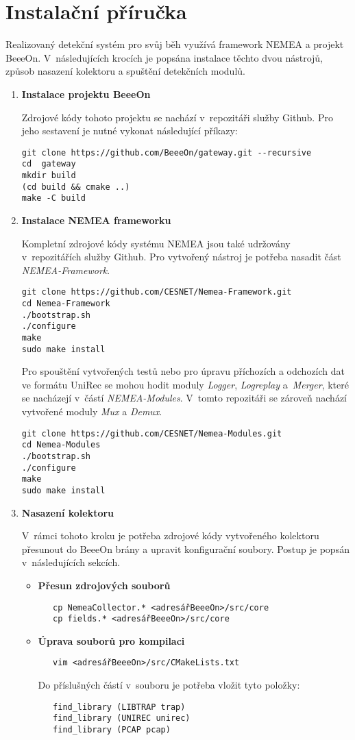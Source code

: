 \documentclass[thesis=M,czech]{FITthesis}[2012/06/26]
\begin{document}
\chapter{Instalační příručka}
Realizovaný detekční systém pro svůj běh využívá framework NEMEA a projekt BeeeOn. V~následujících
krocích je popsána instalace těchto dvou nástrojů, způsob nasazení kolektoru a
spuštění detekčních modulů.

\begin{enumerate}
 \item \textbf{Instalace projektu BeeeOn}
 
 Zdrojové kódy tohoto projektu se nachází v~repozitáři služby Github. Pro jeho sestavení je nutné
 vykonat následující příkazy: 
\begin{verbatim}
git clone https://github.com/BeeeOn/gateway.git --recursive
cd  gateway
mkdir build
(cd build && cmake ..)
make -C build
\end{verbatim}
 \item \textbf{Instalace NEMEA frameworku}
 
Kompletní zdrojové kódy systému NEMEA jsou také udržovány v~repozitářích služby Github. Pro
vytvořený nástroj je potřeba nasadit část \textit{NEMEA-Framework}.
\begin{verbatim}
git clone https://github.com/CESNET/Nemea-Framework.git
cd Nemea-Framework
./bootstrap.sh
./configure
make
sudo make install
\end{verbatim}

Pro spouštění vytvořených testů nebo pro úpravu příchozích a odchozích dat ve formátu UniRec se
mohou hodit moduly \textit{Logger}, \textit{Logreplay} a~\textit{Merger}, které se nacházejí
v~částí \textit{NEMEA-Modules}. V~tomto 
repozitáři se zároveň nachází vytvořené moduly \textit{Mux} a \textit{Demux}.
\begin{verbatim}
git clone https://github.com/CESNET/Nemea-Modules.git
cd Nemea-Modules
./bootstrap.sh
./configure
make
sudo make install
\end{verbatim}

\item \textbf{Nasazení kolektoru}

V~rámci tohoto kroku je potřeba zdrojové kódy vytvořeného kolektoru přesunout do BeeeOn brány
a upravit konfigurační soubory. Postup je popsán v~následujících sekcích.
\begin{itemize}
 \item \textbf{Přesun zdrojových souborů}
\begin{verbatim}
   cp NemeaCollector.* <adresářBeeeOn>/src/core
   cp fields.* <adresářBeeeOn>/src/core
\end{verbatim}
\item \textbf{Úprava souborů pro kompilaci}
\begin{verbatim}
   vim <adresářBeeeOn>/src/CMakeLists.txt
\end{verbatim}
Do příslušných částí v~souboru je potřeba vložit tyto položky: 
\begin{verbatim}
   find_library (LIBTRAP trap)
   find_library (UNIREC unirec)
   find_library (PCAP pcap)


\end{verbatim}
\end{itemize}
\end{enumerate}
\end{document}
